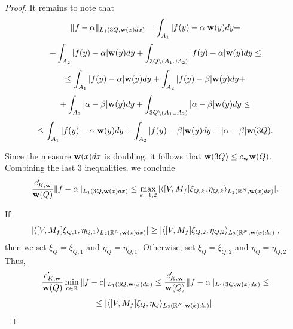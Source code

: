 \documentclass{amsart}
\begin{document}
\begin{proof}
It remains to note that
$$\|f-\alpha\|_{L_1(3Q,{\bf w}(x)dx)}=\int_{A_1}|f(y)-\alpha|{\bf w}(y)dy+$$
$$+\int_{A_2}|f(y)-\alpha|{\bf w}(y)dy+\int_{3Q\backslash(A_1\cup A_2)}|f(y)-\alpha|{\bf w}(y)dy\leq$$
$$\leq\int_{A_1}|f(y)-\alpha|{\bf w}(y)dy+\int_{A_2}|f(y)-\beta|{\bf w}(y)dy+$$
$$+\int_{A_2}|\alpha-\beta|{\bf w}(y)dy+\int_{3Q\backslash(A_1\cup A_2)}|\alpha-\beta|{\bf w}(y)dy\leq$$
$$\leq\int_{A_1}|f(y)-\alpha|{\bf w}(y)dy+\int_{A_2}|f(y)-\beta|{\bf w}(y)dy+|\alpha-\beta|{\bf w}(3Q).$$

Since the measure ${\bf w}(x)dx$ is doubling, it follows that ${\bf w}(3Q)\leq c_{\bf w}{\bf w}(Q).$ Combining the last $3$ inequalities, we conclude
$$\frac{c_{K,{\bf w}}'}{{\bf w}(Q)}\|f-\alpha\|_{L_1(3Q,{\bf w}(x)dx)}\leq
\max_{k=1,2}|\langle[V,M_f]\xi_{Q,k},\eta_{Q,k}\rangle_{L_2(\mathbb{R}^N,{\bf w}(x)dx)}|.$$

If
$$|\langle[V,M_f]\xi_{Q,1},\eta_{Q,1}\rangle_{L_2(\mathbb{R}^N,{\bf w}(x)dx)}|\geq
|\langle[V,M_f]\xi_{Q,2},\eta_{Q,2}\rangle_{L_2(\mathbb{R}^N,{\bf w}(x)dx)}|,$$
then we set $\xi_Q=\xi_{Q,1}$ and $\eta_Q=\eta_{Q,1}.$ Otherwise, set $\xi_Q=\xi_{Q,2}$ and $\eta_Q=\eta_{Q,2}.$ Thus,
$$\frac{c_{K,{\bf w}}'}{{\bf w}(Q)}\min_{c\in\mathbb{R}}\|f-c\|_{L_1(3Q,{\bf w}(x)dx)}
\leq\frac{c_{K,{\bf w}}'}{{\bf w}(Q)}\|f-\alpha\|_{L_1(3Q,{\bf w}(x)dx)}\leq$$
$$\leq|\langle[V,M_f]\xi_Q,\eta_Q\rangle_{L_2(\mathbb{R}^N,{\bf w}(x)dx)}|.$$
\end{proof}
\end{document}
